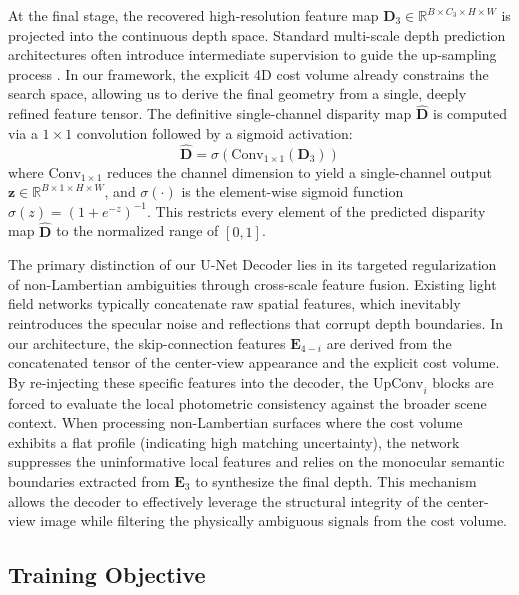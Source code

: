 \documentclass[lettersize,journal]{IEEEtran}
\begin{document}
At the final stage, the recovered high-resolution feature map $\mathbf{D}_3 \in \mathbb{R}^{B \times C_3 \times H \times W}$ is projected into the continuous depth space. Standard multi-scale depth prediction architectures often introduce intermediate supervision to guide the up-sampling process \cite{eigen2014}. In our framework, the explicit 4D cost volume already constrains the search space, allowing us to derive the final geometry from a single, deeply refined feature tensor. The definitive single-channel disparity map $\hat{\mathbf{D}}$ is computed via a $1 \times 1$ convolution followed by a sigmoid activation:
\begin{equation}
\hat{\mathbf{D}} = \sigma \left( \text{Conv}_{1 \times 1}(\mathbf{D}_3) \right)
\end{equation}
where $\text{Conv}_{1 \times 1}$ reduces the channel dimension to yield a single-channel output $\mathbf{z} \in \mathbb{R}^{B \times 1 \times H \times W}$, and $\sigma(\cdot)$ is the element-wise sigmoid function $\sigma(z) = (1 + e^{-z})^{-1}$. This restricts every element of the predicted disparity map $\hat{\mathbf{D}}$ to the normalized range of $[0, 1]$. 

The primary distinction of our U-Net Decoder lies in its targeted regularization of non-Lambertian ambiguities through cross-scale feature fusion. Existing light field networks \cite{heber2018} \cite{lyu2022} typically concatenate raw spatial features, which inevitably reintroduces the specular noise and reflections that corrupt depth boundaries. In our architecture, the skip-connection features $\mathbf{E}_{4-i}$ are derived from the concatenated tensor of the center-view appearance and the explicit cost volume. By re-injecting these specific features into the decoder, the $\text{UpConv}_i$ blocks are forced to evaluate the local photometric consistency against the broader scene context. When processing non-Lambertian surfaces where the cost volume exhibits a flat profile (indicating high matching uncertainty), the network suppresses the uninformative local features and relies on the monocular semantic boundaries extracted from $\mathbf{E}_3$ to synthesize the final depth. This mechanism allows the decoder to effectively leverage the structural integrity of the center-view image while filtering the physically ambiguous signals from the cost volume.

\subsection{Training Objective}
\end{document}
